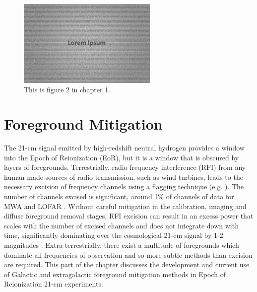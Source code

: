 \begin{figure}[]
\begin{center}
\includegraphics[width=0.6\textwidth]{Chapman_Jelic/01x02}
\end{center}
\caption{This is figure 2 in chapter 1.}
\end{figure}

\section{Foreground Mitigation}

The 21-cm signal emitted by high-redshift neutral hydrogen provides a window into the Epoch of Reionization (EoR), but it is a window that is obscured by layers of foregrounds. Terrestrially, radio frequency interference (RFI) from any human-made sources of radio transmission, such as wind turbines, leads to the necessary excision of frequency channels using a flagging technique (e.g. \citet{Prasad2012ExA....33..157P,Offringa2012}). The number of channels excised is significant, around 1$\%$ of channels of data for MWA and LOFAR \citep{Offringa2019MNRAS.484.2866O,Offringa2015PASA...32....8O}. Without careful mitigation in the calibration, imaging and diffuse foreground removal stages, RFI excision can result in an excess power that scales with the number of excised channels and does not integrate down with time, significantly dominating over the cosmological 21-cm signal by 1-2 magnitudes \citep{Offringa2019MNRAS.484.2866O}. Extra-terrestrially, there exist a multitude of foregrounds which dominate all frequencies of observation and so more subtle methods than excision are required. This part of the chapter discusses the development and current use of Galactic and extragalactic foreground mitigation methods in Epoch of Reionization 21-cm experiments.


